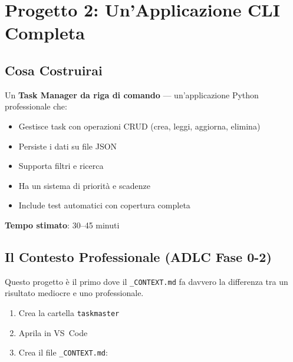 \chapter{Progetto 2: Un'Applicazione CLI Completa}

\section*{Cosa Costruirai}
Un \textbf{Task Manager da riga di comando} --- un'applicazione Python professionale che:
\begin{itemize}
  \item Gestisce task con operazioni CRUD (crea, leggi, aggiorna, elimina)
  \item Persiste i dati su file JSON
  \item Supporta filtri e ricerca
  \item Ha un sistema di priorità e scadenze
  \item Include test automatici con copertura completa
\end{itemize}

\textbf{Tempo stimato}: 30--45 minuti

\section{Il Contesto Professionale (ADLC Fase 0-2)}

Questo progetto è il primo dove il \texttt{\_CONTEXT.md} fa davvero la differenza tra un risultato mediocre e uno professionale.

\begin{praticabox}[title={Pratica --- Setup del progetto}]
\begin{enumerate}
  \item Crea la cartella \texttt{taskmaster}
  \item Aprila in VS~Code
  \item Crea il file \texttt{\_CONTEXT.md}:
\end{enumerate}
\end{praticabox}

